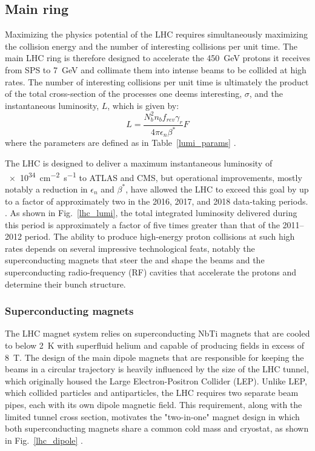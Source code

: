 

\subsection{Main ring}
Maximizing the physics potential of the LHC requires simultaneously maximizing the collision energy and the number of interesting collisions per unit time. The main LHC ring is therefore designed to accelerate the \SI{450}{\GeV} protons it receives from SPS to \SI{7}{\GeV} and collimate them into intense beams to be collided at high rates. The number of interesting collisions per unit time is ultimately the product of the total cross-section of the processes one deems interesting, $\sigma$, and the instantaneous luminosity, $L$, which is given by:
\begin{equation}
\label{lumi_eq}
L = \frac{N_{b}^{2} n_{b} f_{rev} \gamma_{r}}{4 \pi \epsilon_{n} \beta^{*}}F
\end{equation}
where the parameters are defined as in Table~\ref{lumi_params}  \cite{lhc_machine}.



The LHC is designed to deliver a maximum instantaneous luminosity of \SI{e34}{\cm\tothe{-2}\s\tothe{-1}} to ATLAS and CMS, but operational improvements, mostly notably a reduction in $\epsilon_{n}$ and $\beta^{*}$, have allowed the LHC to exceed this goal by up to a factor of approximately two in the 2016, 2017, and 2018 data-taking periods. \cite{lhc_run2_operation}. As shown in Fig.~\ref{lhc_lumi}, the total integrated luminosity delivered during this period is approximately a factor of five times greater than that of the 2011--2012 period. The ability to produce high-energy proton collisions at such high rates depends on several impressive technological feats, notably the superconducting magnets that steer the and shape the beams and the superconducting radio-frequency (RF) cavities that accelerate the protons and determine their bunch structure.



\subsubsection{Superconducting magnets}
The LHC magnet system relies on superconducting NbTi magnets that are cooled to below \SI{2}{\K} with superfluid helium and capable of producing fields in excess of \SI{8}{\tesla}. The design of the main dipole magnets that are responsible for keeping the beams in a circular trajectory is heavily influenced by the size of the LHC tunnel, which originally housed the Large Electron-Positron Collider (LEP). Unlike LEP, which collided particles and antiparticles, the LHC requires two separate beam pipes, each with its own dipole magnetic field. This requirement, along with the limited tunnel cross section, motivates the "two-in-one" magnet design in which both superconducting magnets share a common cold mass and cryostat, as shown in Fig.~\ref{lhc_dipole} \cite{lhc_machine}.

